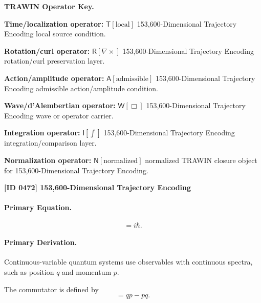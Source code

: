 \par\vspace{0.45\baselineskip}
\noindent\begin{minipage}[t]{\linewidth}
\begingroup
\small
\raggedright
\textbf{TRAWIN Operator Key.}\par
\noindent\textbf{Time/localization operator:} $\mathsf{T}\!\left[\mathrm{local}\right]$ 153,600-Dimensional Trajectory Encoding local source condition.\par
\noindent\textbf{Rotation/curl operator:} $\mathsf{R}\!\left[\nabla\times\right]$ 153,600-Dimensional Trajectory Encoding rotation/curl preservation layer.\par
\noindent\textbf{Action/amplitude operator:} $\mathsf{A}\!\left[\mathrm{admissible}\right]$ 153,600-Dimensional Trajectory Encoding admissible action/amplitude condition.\par
\noindent\textbf{Wave/d'Alembertian operator:} $\mathsf{W}\!\left[\Box\right]$ 153,600-Dimensional Trajectory Encoding wave or operator carrier.\par
\noindent\textbf{Integration operator:} $\mathsf{I}\!\left[\int\right]$ 153,600-Dimensional Trajectory Encoding integration/comparison layer.\par
\noindent\textbf{Normalization operator:} $\mathsf{N}\!\left[\mathrm{normalized}\right]$ normalized TRAWIN closure object for 153,600-Dimensional Trajectory Encoding.\par
\endgroup
\end{minipage}

\clearpage
\noindent\textbf{[ID 0472] 153,600-Dimensional Trajectory Encoding}\par
\vspace{0.35em}
\paragraph{Primary Equation.}
\begin{equation}
[q,p]=i\hbar .
\end{equation}

\paragraph{Primary Derivation.}
Continuous-variable quantum systems use observables with continuous spectra, such as position $q$ and momentum $p$.

The commutator is defined by
\begin{equation}
[q,p]=qp-pq .
\end{equation}

